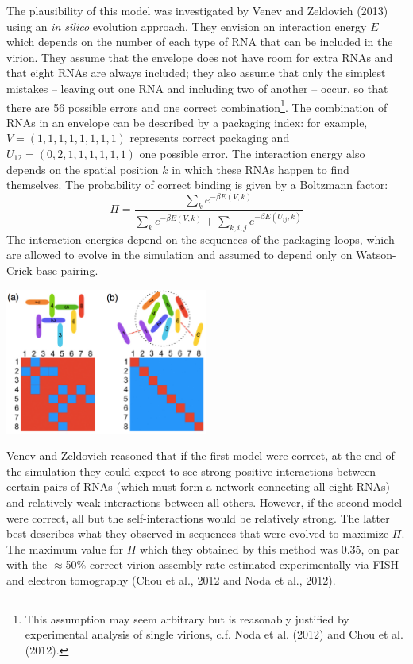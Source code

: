 \documentclass{article}
\begin{document}
The plausibility of this model was investigated by Venev and Zeldovich (2013) using an \textit{in silico} evolution approach. They envision an interaction energy $E$ which depends on the number of each type of RNA that can be included in the virion. They assume that the envelope does not have room for extra RNAs and that eight RNAs are always included; they also assume that only the simplest mistakes -- leaving out one RNA and including two of another -- occur, so that there are 56 possible errors and one correct combination\footnote{This assumption may seem arbitrary but is reasonably justified by experimental analysis of single virions, c.f. Noda et al. (2012) and Chou et al. (2012).}. The combination of RNAs in an envelope can be described by a packaging index: for example, $V=(1,1,1,1,1,1,1,1)$ represents correct packaging and $U_{12}=(0,2,1,1,1,1,1,1)$ one possible error. The interaction energy also depends on the spatial position $k$ in which these RNAs happen to find themselves. The probability of correct binding is given by a Boltzmann factor:
\[ \Pi = \frac{\sum_{k} e^{-\beta E(V,k)}}{\sum_{k} e^{-\beta E(V,k)} + \sum_{k,i,j} e^{-\beta E(U_{ij},k)}} \]
The interaction energies depend on the sequences of the packaging loops, which are allowed to evolve in the simulation and assumed to depend only on Watson-Crick base pairing.

\begin{center}
\includegraphics[width=0.5\textwidth]{venev2.pdf}
\end{center}

Venev and Zeldovich reasoned that if the first model were correct, at the end of the simulation they could expect to see strong positive interactions between certain pairs of RNAs (which must form a network connecting all eight RNAs) and relatively weak interactions between all others. However, if the second model were correct, all but the self-interactions would be relatively strong. The latter best describes what they observed in sequences that were evolved to maximize $\Pi$. The maximum value for $\Pi$ which they obtained by this method was 0.35, on par with the $\approx$50\% correct virion assembly rate estimated experimentally via FISH and electron tomography (Chou et al., 2012 and Noda et al., 2012).
\end{document}
